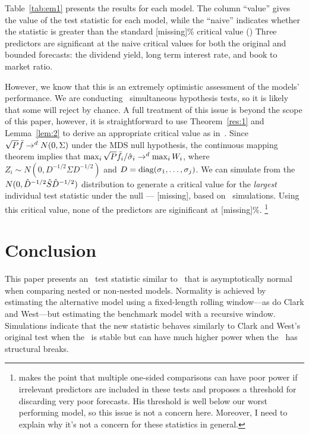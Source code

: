 \documentclass[12pt,fleqn]{article}
\providecommand\bootsize{[missing]}
\providecommand\empiricalcriticalvalue{[missing]}
\begin{document}
Table~\ref{tab:em1} presents the results for each model.  The column
``value'' gives the value of the test statistic for each model, while
the ``naive'' indicates whether the statistic is greater than the
standard \bootsize\% critical value (\naivecriticalvalue) Three
predictors are
significant at the naive critical values for both the original and
bounded forecasts: the dividend yield, long term interest rate, and
book to market ratio.

However, we know that this is an extremely optimistic assessment of
the models' performance. We are conducting \nmod\ simultaneous
hypothesis tests, so it is likely that some will reject by chance. A
full treatment of this issue is beyond the scope of this paper,
however, it is straightforward to use Theorem~\ref{res:1} and
Lemma~\ref{lem:2} to derive an appropriate critical value as
in~\citet{Whi:00}. Since $\sqrt{P} \bar{f} \to^d N(0, \Sigma)$ under
the MDS null hypothesis, the continuous mapping theorem implies that
$\max_i \sqrt{P} \bar{f}_i/\hat\sigma_i \to^d \max_i W_i$, where $Z_i
\sim N(0, D^{-1/2} \Sigma D^{-1/2})$ and $D = \operatorname{diag}(\sigma_1, \dots,
\sigma_j)$. We can simulate from the $N(0, \hat D^{-1/2} \hat{S}
\hat D^{-1/2})$ distribution to generate a critical value for the
\emph{largest} individual test statistic under the null ---
\empiricalcriticalvalue, based on \empiricaldraws\ simulations. Using
this critical value, none of the predictors are siginificant at
\bootsize\%.%
\footnote{\citet{Han:05} makes the point that multiple one-sided
  comparisons can have poor power if irrelevant predictors are
  included in these tests and proposes a threshold for discarding very
  poor forecasts. His threshold is well below our worst performing
  model, so this issue is not a concern here. Moreover, I need to
  explain why it's not a concern for these statistics in general.} %

\section{Conclusion}\label{sec:4}
This paper presents an \oos\ test statistic similar to \poscw\ that is
asymptotically normal when comparing nested or non-nested models.
Normality is achieved by estimating the alternative model using a
fixed-length rolling window---as do Clark and West---but estimating
the benchmark model with a recursive window.  Simulations indicate
that the new statistic behaves similarly to Clark and West's original
test when the \dgp\ is stable but can have much higher power when the 
\dgp\ has structural breaks.


\end{document}
